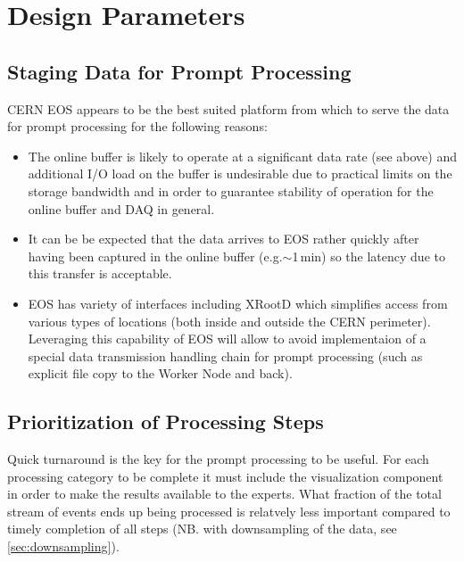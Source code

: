 \documentclass[pdftex,12pt,letter]{article}
\newcommand{\xrd}{XRootD\xspace}
\begin{document}
\section{Design Parameters}
\subsection{Staging Data for Prompt Processing}
CERN EOS appears to be the best suited platform from which to
serve the data for prompt processing for the following reasons:
\begin{itemize}

\item The online buffer is likely to operate at a significant data rate (see above) and additional I/O load on the buffer is undesirable
due to practical limits on the storage bandwidth and in order to guarantee stability of operation for the online buffer and DAQ in general.

\item It can be be expected that the data arrives to EOS rather quickly after having been captured in the online buffer (e.g.$\sim$1\,min) so
the latency due to this transfer is acceptable.

\item EOS has variety of interfaces including \xrd which simplifies access from various types of locations (both inside and outside the CERN perimeter).
Leveraging this capability of EOS will allow to avoid implementaion of a special data transmission handling chain for prompt processing (such as explicit
file copy to the Worker Node and back).


\end{itemize}

\subsection{Prioritization of Processing Steps}
Quick turnaround is the key for the prompt processing to be useful. For each processing category
to be complete it must include the visualization component in order to make the results available
to the experts. What fraction of the total stream of events ends up being processed is relatvely less
important compared to timely completion of all steps (NB. with downsampling of the data, see 
\ref{sec:downsampling}).
\end{document}
